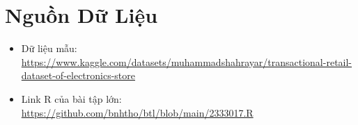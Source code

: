 \section{Nguồn Dữ Liệu}
\begin{itemize}
    \item Dữ liệu mẫu: \href{https://www.kaggle.com/datasets/muhammadshahrayar/transactional-retail-dataset-of-electronics-store}{https://www.kaggle.com/datasets/muhammadshahrayar/transactional-retail-dataset-of-electronics-store}
    \item Link R của bài tập lớn: 
    \href{https://github.com/bnhtho/btl_xtsk_241/blob/main/2333017_Assigment.R}{https://github.com/bnhtho/btl/blob/main/2333017.R}
    
\end{itemize}

